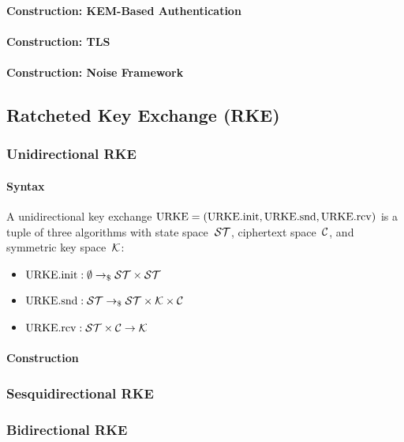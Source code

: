 \documentclass[a4paper,orivec]{llncs}
\begin{document}
\paragraph{Construction: KEM-Based Authentication}

\paragraph{Construction: TLS}

\paragraph{Construction: Noise Framework}


\subsection{Ratcheted Key Exchange (RKE)}

\subsubsection{Unidirectional RKE}

\paragraph{Syntax}
A unidirectional key exchange $\mathrm{URKE}=(\mathrm{URKE}.\mathrm{init},\mathrm{URKE}.\mathrm{snd},\mathrm{URKE}.\mathrm{rcv})$ is a tuple of three algorithms with state space~$\mathcal{ST}$, ciphertext space~$\mathcal{C}$, and symmetric key space~$\mathcal{K}$:

\begin{itemize}
    \item $\mathrm{URKE}.\mathrm{init}: \emptyset \to_\$ \mathcal{ST}\times\mathcal{ST}$
    \item $\mathrm{URKE}.\mathrm{snd}: \mathcal{ST} \to_\$ \mathcal{ST}\times\mathcal{K}\times\mathcal{C}$
    \item $\mathrm{URKE}.\mathrm{rcv}: \mathcal{ST}\times\mathcal{C} \to \mathcal{K}$
\end{itemize}

\paragraph{Construction}

\subsubsection{Sesquidirectional RKE}

\subsubsection{Bidirectional RKE}
\end{document}
